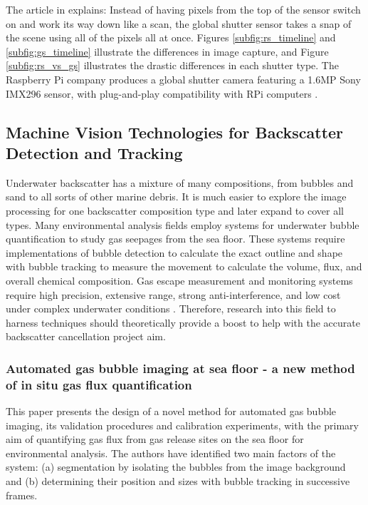 The article in \cite{updatedWhatGlobalShutter2021} explains: Instead of having pixels from the top of the sensor switch on and work its way down like a scan, the global shutter sensor takes a snap of the scene using all of the pixels all at once. Figures \ref{subfig:rs_timeline} and \ref{subfig:gs_timeline} illustrate the differences in image capture, and Figure \ref{subfig:rs_vs_gs} illustrates the drastic differences in each shutter type. The Raspberry Pi company produces a global shutter camera featuring a 1.6MP Sony IMX296 sensor, with plug-and-play compatibility with RPi computers \cite{raspberrypiltdBuyRaspberryPib}.

\subsection{Machine Vision Technologies for Backscatter Detection and Tracking}
Underwater backscatter has a mixture of many compositions, from bubbles and sand to all sorts of other marine debris. It is much easier to explore the image processing for one backscatter composition type and later expand to cover all types. Many environmental analysis fields employ systems for underwater bubble quantification to study gas seepages from the sea floor. These systems require implementations of bubble detection to calculate the exact outline and shape with bubble tracking to measure the movement to calculate the volume, flux, and overall chemical composition. Gas escape measurement and monitoring systems require high precision, extensive range, strong anti-interference, and low cost under complex underwater conditions \cite{zhangUnderwaterBubbleEscape2023}. Therefore, research into this field to harness techniques should theoretically provide a boost to help with the accurate backscatter cancellation project aim.

\subsubsection{Automated gas bubble imaging at sea floor - a new method of in situ gas flux quantification \cite{thomanekAutomatedGasBubble2010}}
This paper presents the design of a novel method for automated gas bubble imaging, its validation procedures and calibration experiments, with the primary aim of quantifying gas flux from gas release sites on the sea floor for environmental analysis. The authors have identified two main factors of the system: (a) segmentation by isolating the bubbles from the image background and (b) determining their position and sizes with bubble tracking in successive frames.

